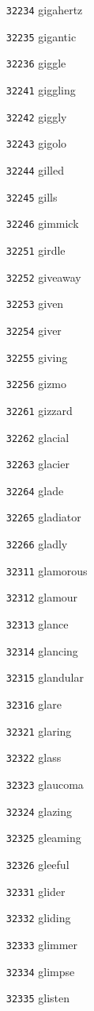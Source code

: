 \documentclass[twoside,11pt]{article}
\begin{document}
\begin{multicols}{5}
\begin{enumerate}
\item[\texttt{32234}] gigahertz
\item[\texttt{32235}] gigantic
\item[\texttt{32236}] giggle
\item[\texttt{32241}] giggling
\item[\texttt{32242}] giggly
\item[\texttt{32243}] gigolo
\item[\texttt{32244}] gilled
\item[\texttt{32245}] gills
\item[\texttt{32246}] gimmick
\item[\texttt{32251}] girdle
\item[\texttt{32252}] giveaway
\item[\texttt{32253}] given
\item[\texttt{32254}] giver
\item[\texttt{32255}] giving
\item[\texttt{32256}] gizmo
\item[\texttt{32261}] gizzard
\item[\texttt{32262}] glacial
\item[\texttt{32263}] glacier
\item[\texttt{32264}] glade
\item[\texttt{32265}] gladiator
\item[\texttt{32266}] gladly
\item[\texttt{32311}] glamorous
\item[\texttt{32312}] glamour
\item[\texttt{32313}] glance
\item[\texttt{32314}] glancing
\item[\texttt{32315}] glandular
\item[\texttt{32316}] glare
\item[\texttt{32321}] glaring
\item[\texttt{32322}] glass
\item[\texttt{32323}] glaucoma
\item[\texttt{32324}] glazing
\item[\texttt{32325}] gleaming
\item[\texttt{32326}] gleeful
\item[\texttt{32331}] glider
\item[\texttt{32332}] gliding
\item[\texttt{32333}] glimmer
\item[\texttt{32334}] glimpse
\item[\texttt{32335}] glisten

\end{enumerate}
\end{multicols}
\end{document}
